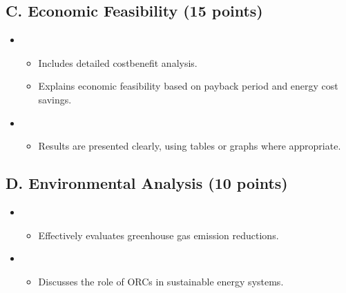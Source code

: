 \documentclass[letterpaper,10pt,english]{jupyterBook}
\begin{document}
\subsection{C. Economic Feasibility (15 points)}
\label{\detokenize{ProjectSyllabus:c-economic-feasibility-15-points}}\begin{itemize}
\item {} 
\sphinxAtStartPar
{}
\begin{itemize}
\item {} 
\sphinxAtStartPar
Includes detailed cost\sphinxhyphen{}benefit analysis.

\item {} 
\sphinxAtStartPar
Explains economic feasibility based on payback period and energy cost savings.

\end{itemize}

\item {} 
\sphinxAtStartPar
{}
\begin{itemize}
\item {} 
\sphinxAtStartPar
Results are presented clearly, using tables or graphs where appropriate.

\end{itemize}

\end{itemize}


\subsection{D. Environmental Analysis (10 points)}
\label{\detokenize{ProjectSyllabus:d-environmental-analysis-10-points}}\begin{itemize}
\item {} 
\sphinxAtStartPar
{}
\begin{itemize}
\item {} 
\sphinxAtStartPar
Effectively evaluates greenhouse gas emission reductions.

\end{itemize}

\item {} 
\sphinxAtStartPar
{}
\begin{itemize}
\item {} 
\sphinxAtStartPar
Discusses the role of ORCs in sustainable energy systems.

\end{itemize}

\end{itemize}
\end{document}
